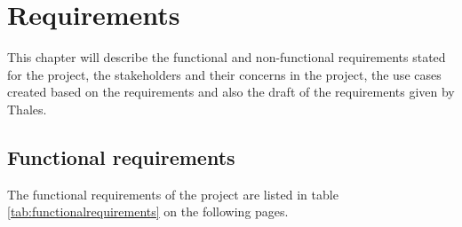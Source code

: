 \chapter{Requirements}\label{ch:requirements}

This chapter will describe the functional and non-functional requirements stated for the project, the stakeholders and their concerns in the project, the use cases created based on the requirements and also the draft of the requirements given by Thales. 

\section{Functional requirements}
The functional requirements of the project are listed in table \ref{tab:functionalrequirements} on the following pages.